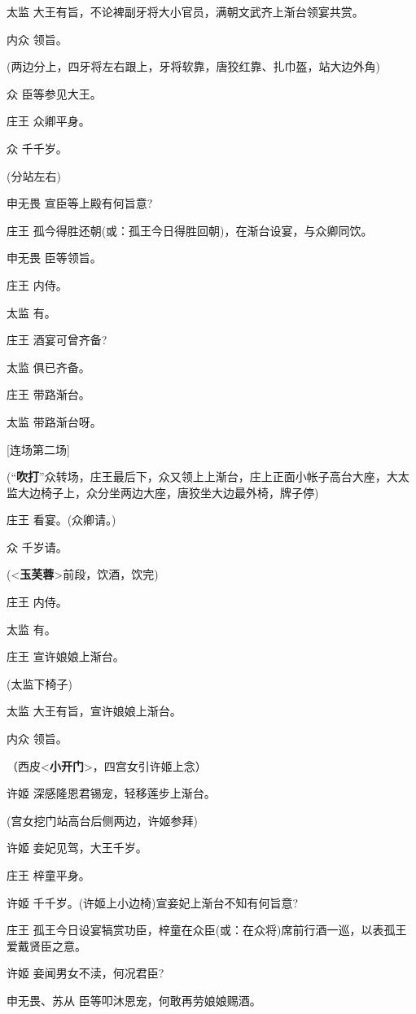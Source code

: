 太监 大王有旨，不论裨副牙将大小官员，满朝文武齐上渐台领宴共赏。

内众 领旨。

(两边分上，四牙将左右跟上，牙将软靠，唐狡红靠、扎巾盔，站大边外角)

众 臣等参见大王。

庄王 众卿平身。

众 千千岁。

(分站左右)

申无畏 宣臣等上殿有何旨意?

庄王 孤今得胜还朝(或：孤王今日得胜回朝)，在渐台设宴，与众卿同饮。

申无畏 臣等领旨。

庄王 内侍。

太监 有。

庄王 酒宴可曾齐备?

太监 俱已齐备。

庄王 带路渐台。

太监 带路渐台呀。

{[}连场第二场{]}

(``\textbf{吹打}''众转场，庄王最后下，众又领上上渐台，庄上正面小帐子高台大座，大太监大边椅子上，众分坐两边大座，唐狡坐大边最外椅，牌子停)

庄王 看宴。(众卿请。)

众 千岁请。

(\textless{}\textbf{玉芙蓉}\textgreater{}前段，饮酒，饮完)

庄王 内侍。

太监 有。

庄王 宣许娘娘上渐台。

(太监下椅子)

太监 大王有旨，宣许娘娘上渐台。

内众 领旨。

（西皮\textless{}\textbf{小开门}\textgreater{}，四宫女引许姬上念）

许姬 深感隆恩君锡宠，轻移莲步上渐台。

(宫女挖门站高台后侧两边，许姬参拜)

许姬 妾妃见驾，大王千岁。

庄王 梓童平身。

许姬 千千岁。(许姬上小边椅)宣妾妃上渐台不知有何旨意?

庄王
孤王今日设宴犒赏功臣，梓童在众臣(或：在众将)席前行酒一巡，以表孤王爱戴贤臣之意。

许姬 妾闻男女不渎，何况君臣?

申无畏、苏从 臣等叩沐恩宠，何敢再劳娘娘赐酒。

